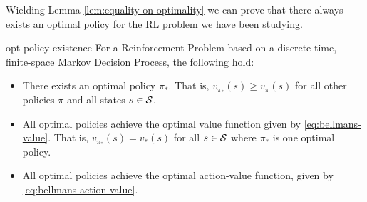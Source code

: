Wielding Lemma \ref{lem:equality-on-optimality} we can prove that there always
exists an optimal policy for the RL problem we have been studying.

\begin{thrm}{}{opt-policy-existence}
    For a Reinforcement Problem based on a discrete-time, finite-space Markov
    Decision Process, the following hold:
    \begin{itemize}
        \item There exists an optimal policy $\pi_*$. That is, $v_{\pi_*} (s)
            \geq v_{\pi}(s)$ for all other policies $\pi$ and all states $s \in
            \mathcal{S}$.
        \item All optimal policies achieve the optimal value function given by
            \eqref{eq:bellmans-value}. That is, $v_{\pi_*}(s) = v_* (s)$ for all
            $s \in \mathcal{S}$ where $\pi_*$ is one optimal policy.
        \item All optimal policies achieve the optimal action-value function,
            given by \eqref{eq:bellmans-action-value}.
    \end{itemize}
\end{thrm}


